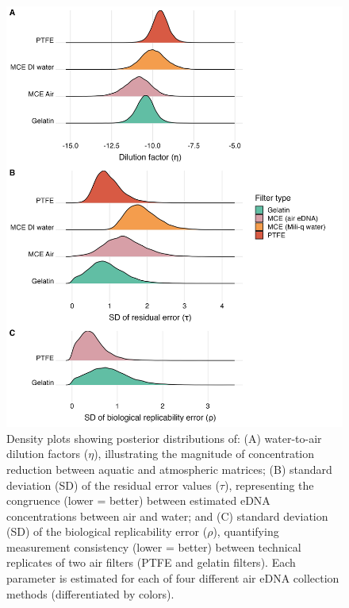 \documentclass{article}
\begin{document}
\begin{figure}[tbhp] 
\centering
\includegraphics[width=15.5cm]{Plots/Figure_2.jpg}  
\caption{Density plots showing posterior distributions of: (A) water-to-air dilution factors ($\eta$), illustrating the magnitude of concentration reduction between aquatic and atmospheric matrices; (B) standard deviation (SD) of the residual error values ($\tau$), representing the congruence (lower = better) between estimated eDNA concentrations between air and water; and (C) standard deviation (SD) of the biological replicability error ($\rho$), quantifying measurement consistency (lower = better) between technical replicates of two air filters (PTFE and gelatin filters). Each parameter is estimated for each of four different air eDNA collection methods (differentiated by colors).}
\label{fig:fig2}
\end{figure}

\end{document}
